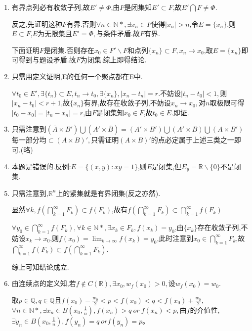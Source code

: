 \documentclass[UTF8, a4paper, 12pt, oneside, onecolumn]{article}
\numberwithin{equation}{section}
\numberwithin{figure}{section}
\numberwithin{table}{section}
\theoremstyle{nonumberplain}	%
\theoremstyle{plain}	%
\theoremstyle{plain}	%
\theoremstyle{plain}	%
\theoremstyle{plain}	%
\theoremstyle{nonumberplain}
\begin{document}
\begin{enumerate}
	\item 有界点列必有收敛子列,故$E'\neq \Phi$,由$F$是闭集知$E'\subset F$,故$E'\bigcap F\neq \Phi$.
	
	反之,先证明这种$F$有界.否则$\forall n\in \mathbb{N*},\exists x_n\in F$使得$|x_n|>n$,令$E=\{x_n\}$,则$E\subset F$,$E$为无限集且$E'=\Phi ,$与条件矛盾.故$F$有界.
	
	下面证明$F$是闭集.否则存在$x_0\in F'\backslash F$和点列$\{x_n\}\subset F,x_n\rightarrow x_0$,取$E=\{x_n\}$即可得到与题设矛盾.故$F$为闭集.综上即得结论.
	
	\item 只需用定义证明,E的任何一个聚点都在E中.
	
	$\forall t_0\in E',\exists \{t_n\}\subset E,t_n\rightarrow t_0,\exists \{x_n\},|x_n-t_n|=r.$不妨设$|t_n-t_0|<1,$则$|x_n-t_0|<r+1$,故$\{x_n\}$有界,故存在收敛子列,不妨设$x_n\rightarrow x_0,$对$n$取极限可得$|t_0-x_0|=|t_n-x_n|=r$,由$F$是闭集知$x_0\in F$,故$t_0\in E$.即证.
	
	\item 只需注意到$(\overline{A}\times B')\bigcup(A'\times\overline{B})=(A'\times B')\bigcup(A'\times B)\bigcup(A\times B')$每一部分均$\subset(A\times B)',$只需证明$(A\times B)'$的点必定属于上述三类之一即可.(略)
	
	\item 本题是错误的.反例:$E=\{(x,y):xy=1\}$,则$E$是闭集,但$E_y=\mathbb{R}\backslash\{0\}$不是闭集.
	\item 只需注意到,$\mathbb{R}^n$上的紧集就是有界闭集(反之亦然).
	
	显然$\displaystyle\forall k,f(\bigcap_{k=1}^{\infty}F_k)\subset f(F_k)$,故有$\displaystyle f(\bigcap_{k=1}^{\infty}F_k)\subset \bigcap_{k=1}^{\infty}f(F_k)$
	
	$\displaystyle\forall y_0\in \bigcap_{k=1}^{\infty}f(F_k),\forall k\in \mathbb{N*},\exists x_k\in F_k,f(x_k)=y_0$,由$\{x_k\}$存在收敛子列,不妨设$x_k\rightarrow x_0$,则$\displaystyle f(x_0)=\lim_{k\rightarrow \infty}f(x_k)=y_0$,此时注意到$\displaystyle x_0\in \bigcap_{k=1}^{\infty}F_k$,故$\displaystyle  \bigcap_{k=1}^{\infty}f(F_k)\subset f(\bigcap_{k=1}^{\infty}F_k)$.
	
	综上可知结论成立.
	
	\item 由连续点的定义知,若$\displaystyle f\notin C(\mathbb{R}),\exists x_0,w_f(x_0)>0,$设$\displaystyle w_f(x_0)=w_0$.
	
	取$p\in \mathbb{Q},q\in \mathbb{Q}$且$\displaystyle f(x_0)-\frac{w_0}{2}<p<f(x_0)<q<f(x_0)+\frac{w_0}{2}$,$\displaystyle \forall n\in \mathbb{N*},\exists x_n\in B(x_0,\frac{1}{n}),f(x_n)>q~or~f(x_n)<p,$由$f$的介值性,$\displaystyle \exists y_n\in B(x_0,\frac{1}{n}),f(y_n)=q~or f(y_n)=p$。
	

\end{enumerate}
\end{document}
